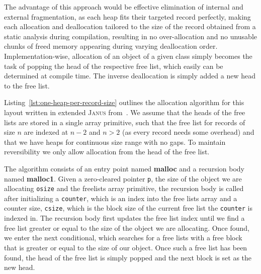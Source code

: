 The advantage of this approach would be effective elimination of internal and external fragmentation, as each heap fits their targeted record perfectly, making each allocation and deallocation tailored to the size of the record obtained from a static analysis during compilation, resulting in no over-allocation and no unusable chunks of freed memory appearing during varying deallocation order. Implementation-wise, allocation of an object of a given class simply becomes the task of popping the head of the respective free list, which easily can be determined at compile time. The inverse deallocation is simply added a new head to the free list.

Listing~\ref{lst:one-heap-per-record-size} outlines the allocation algorithm for this layout written in extended \textsc{Janus} from~\cite{ty:ejanus}. We assume that the heads of the free lists are stored in a single array primitive, such that the free list for records of size $n$ are indexed at $n-2$ and $n > 2$ (as every record needs some overhead) and that we have heaps for continuous size range with no gaps. To maintain reversibility we only allow allocation from the head of the free list.

The algorithm consists of an entry point named \textbf{malloc} and a recursion body named \textbf{malloc1}. Given a zero-cleared pointer \texttt{p}, the size of the object we are allocating \texttt{osize} and the freelists array primitive, the recursion body is called after initializing a \texttt{counter}, which is an index into the free lists array and a counter size, \texttt{csize}, which is the block size of the current free list the \texttt{counter} is indexed in. The recursion body first updates the free list index until we find a free list greater or equal to the size of the object we are allocating. Once found, we enter the next conditional, which searches for a free lists with a free block that is greater or equal to the size of our object. Once such a free list has been found, the head of the free list is simply popped and the next block is set as the new head.

